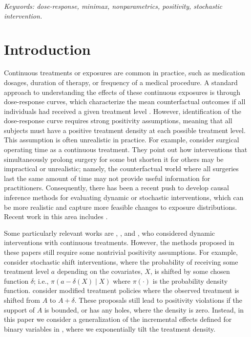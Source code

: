 \documentclass[11pt,twoside]{article}
\theoremstyle{definition}
\theoremstyle{remark}
\begin{document}
\noindent%
{\it Keywords: dose-response, minimax, nonparametrics, positivity, stochastic intervention.} 
\bigskip 

\section{Introduction}

Continuous treatments or exposures are common in practice, such as medication dosages, duration of therapy, or frequency of a medical procedure. A standard approach to understanding the effects of these continuous exposures is through dose-response curves, which characterize the mean counterfactual outcomes if all individuals had received a given treatment level \citep{diaz2013targeted, kennedy2017cte, semenova2021debiased}. However, identification of the dose-response curve requires strong positivity assumptions, meaning that all subjects must have a positive treatment density at each possible treatment level. This assumption is often unrealistic in practice. For example, \cite{haneuserotnitzky2013} consider surgical operating time as a continuous treatment. They point out how interventions that simultaneously prolong surgery for some but shorten it for others may be impractical or unrealistic; namely, the counterfactual world where all surgeries last the same amount of time may not provide useful information for practitioners. Consequently, there has been a recent push to develop causal inference methods for evaluating dynamic or stochastic interventions, which can be more realistic and capture more feasible changes to exposure distributions. Recent work in this area includes \cite{munoz2012population, haneuserotnitzky2013, dudik2014, young2014identification,  kennedy2019nonparametric, diaz2020causal}.

Some particularly relevant works are \cite{munoz2012population},  \cite{haneuserotnitzky2013}, and \cite{young2014identification}, who considered dynamic interventions with continuous treatments. However, the methods proposed in these papers still require some nontrivial positivity assumptions. For example, \cite{munoz2012population} consider stochastic shift interventions, where the probability of receiving some treatment level $a$ depending on the covariates, $X$, is shifted by some chosen function $\delta$; i.e., $\pi(a - \delta(X) \mid X)$ where $\pi(\cdot)$ is the probability density function. \cite{haneuserotnitzky2013} consider modified treatment policies where the observed treatment is shifted from $A$ to $A+\delta$. These proposals still lead to positivity violations if the support of $A$ is bounded, or has any holes, where the density is zero. Instead, in this paper we consider a generalization of the incremental effects defined for binary variables in \cite{kennedy2019nonparametric}, where we exponentially tilt the treatment density.
\end{document}
